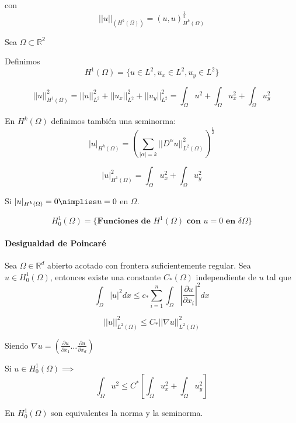 	con 
	$$||u||_(H^k(\Omega)) = (u,u)^\frac{1}{2}_{H^k(\Omega)}$$
	
	\begin{example}
		Sea $\Omega\subset\mathbb{R^2}$
		
		Definimos
		$$H^1(\Omega) = \{u\in L^2, u_x\in L^2, u_y\in L^2\}$$
		
		$$||u||^2_{H^1(\Omega)} = ||u||^2_{L^2} + ||u_x||^2_{L^2} + ||u_y||^2_{L^2} = 
		\int_\Omega u^2 + \int_\Omega u_x^2 + \int_\Omega u_y^2$$
	\end{example}
	
	En $H^k(\Omega)$ definimos también una seminorma:
	$$|u|_{H^k(\Omega)}  = (\sum_{|\alpha|=k}||D^\alpha u||^2_{L^2(\Omega)})^\frac{1}{2}$$
	
	\begin{example}
		$$|u|^2_{H^1(\Omega)} = \int_{\Omega}u_x^2+\int_{\Omega}u_y^2$$
		
		Si $|u|_{H^k(\Omega)} = 0 \nimplies u = 0$ en $\Omega$.
	\end{example}
	
	$$H_0^1(\Omega) = \{\textbf{Funciones de } H^1(\Omega)\textbf{ con } u = 0 \textbf{ en } \delta \Omega \}$$
	
	\paragraph{Desigualdad de Poincaré}
	Sea $\Omega\in\mathbb{R}^d$ abierto acotado con frontera suficientemente regular. Sea $u\in H_0^1(\Omega)$, entonces existe una constante $C_*(\Omega)$ independiente de $u$ tal que
	$$\int_{\Omega}|u|^2 dx \le c_* \sum_{i=1}^n\int_{\Omega}|\frac{\partial u}{\partial x_i}|^2dx$$
	
	$$||u||^2_{L^2(\Omega)}\le C_*||\nabla u||^2_{L^2(\Omega)}$$
	
	Siendo $\nabla u = (\frac{\partial u}{\partial x_1}\hdots\frac{\partial u}{\partial x_d})$
	
	\begin{example}
		Si $u\in H_0^1(\Omega)\implies$
		$$\int_{\Omega}u^2 \le C^*\left[\int_{\Omega}u_x^2+\int_{\Omega}u_y^2\right]$$
	\end{example}
	
	En $H_0^1(\Omega)$ son equivalentes la norma y la seminorma.

